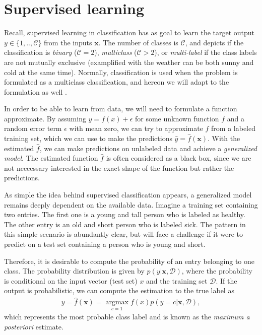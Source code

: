 
\section{Supervised learning}

Recall, supervised learning in classification has as goal to learn the target output $y \in \{1,..,\mathcal{C}\}$ from the inputs $\textbf{x}$. The number of classes is $\mathcal{C}$, and depicts if the classification is \textit{binary} ($\mathcal{C}=2$), \textit{multiclass} ($\mathcal{C}>2$), or \textit{multi-label} if the class labels are not mutually exclusive (examplified with the weather can be both sunny and cold at the same time). Normally, classification is used when the problem is formulated as a multiclass classification, and hereon we will adapt to the formulation as well \cite{Murphy2012}.

In order to be able to learn from data, we will need to formulate a function approximate. By assuming $y = f(x) + \epsilon$ for some unknown function $f$ and a random error term $\epsilon$ with mean zero, we can try to approximate $f$ from a labeled training set, which we can use to make the predictions $\hat{y}=\hat{f}(\textbf{x})$. With the estimated $\hat{f}$, we can make predictions on unlabeled data and achieve a \textit{generalized model}. The estimated function $\hat{f}$ is often considered as a black box, since we are not neccessary interested in the exact shape of the function but rather the predictions.

As simple the idea behind supervised classification appears, a generalized model remains deeply dependent on the available data. Imagine a training set containing two entries. The first one is a young and tall person who is labeled as healthy. The other entry is an old and short person who is labeled sick. The pattern in this simple scenario is abundantly clear, but will face a challenge if it were to predict on a test set containing a person who is young and short.

Therefore, it is desirable to compute the probability of an entry belonging to one class. The probability distribution is given by $p(y|\textbf{x}, \mathcal{D})$, where the probability is conditional on the input vector (test set) $x$ and the training set $\mathcal{D}$. If the output is probabilistic, we can compute the estimation to the true label as
\begin{align}
  \hat{y} = \hat{f}(\textbf{x}) = \operatorname*{argmax}_{c=1} f(x) p(y = c|\textbf{x}, \mathcal{D}),
\end{align}
which represents the most probable class label and is known as the \textit{maximum a posteriori} estimate.

